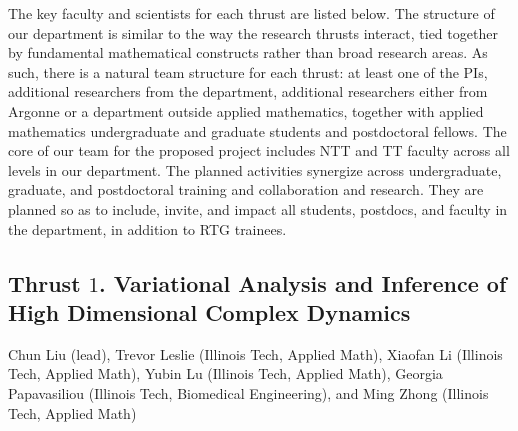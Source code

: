 \documentclass[11pt]{NSFamsart}
\begin{document}
The key faculty and scientists for each thrust are listed below. 
The structure of our department is similar to the way the research thrusts interact, tied together by fundamental mathematical constructs rather than broad research areas. As such, there is a natural team structure for each thrust:  at least one of the PIs,  additional researchers from the department, additional researchers either from Argonne or a department outside applied mathematics, %
together with applied mathematics undergraduate and graduate students and postdoctoral fellows.
The core of our team for the proposed project includes NTT and TT faculty across all levels in our department. The planned activities synergize across undergraduate, graduate, and postdoctoral training and collaboration and research. They are planned so as to include, invite, and impact all students, postdocs, and faculty in the department, in addition to RTG trainees.




\subsection*{Thrust $1$. Variational Analysis and Inference of High Dimensional Complex Dynamics}
Chun Liu (lead), Trevor Leslie (Illinois Tech, Applied Math), Xiaofan Li (Illinois Tech, Applied Math), Yubin Lu (Illinois Tech, Applied Math), Georgia Papavasiliou (Illinois Tech, Biomedical Engineering), and Ming Zhong (Illinois Tech, Applied Math)
\end{document}
